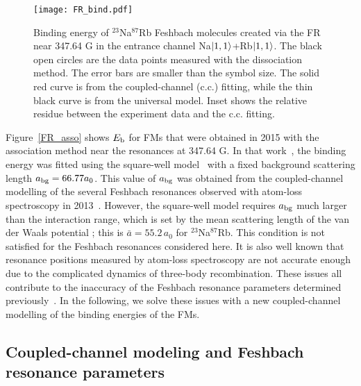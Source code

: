 \begin{figure}[htbp]
\begin{center}
\texttt{[image: FR\_bind.pdf]}
\end{center}
\caption[Binding energy of $^{23}$Na$^{87}$Rb Feshbach molecules at 347.64 G]{Binding energy of $^{23}$Na$^{87}$Rb Feshbach molecules created via the FR near 347.64 G in the entrance channel Na$\ket{1,1}$+Rb$\ket{1,1}$. The black open circles are the data points measured with the dissociation method. The error bars are smaller than the symbol size. The solid red curve is from the coupled-channel (c.c.) fitting, while the thin black curve is from the universal model. Inset shows the relative residue between the experiment data and the c.c. fitting.}
\label{FR_bind}
\end{figure}

Figure~\ref{FR_asso} shows $E_{\rm b}$ for FMs that were obtained in 2015 with the association method\cite{wang2015formation} near the resonances at 347.64 G. In that work~\cite{wang2015formation}, the binding energy was fitted using the square-well model~\cite{Lange2009} with a fixed background scattering length $a_{\rm bg} = 66.77a_0$. This value of $a_{\rm bg}$ was obtained from the coupled-channel modelling of the several Feshbach resonances observed with atom-loss spectroscopy in 2013~\cite{wang2013observation}. However, the square-well model requires $a_{\rm bg}$ much larger than the interaction range, which is set by the mean scattering length of the van der Waals potential \cite{Gribakin1993}; this is $\bar{a} = 55.2\,a_0$ for $^{23}$Na$^{87}$Rb. This condition is not satisfied for the Feshbach resonances considered here. It is also well known that resonance positions measured by atom-loss spectroscopy are not accurate enough due to the complicated dynamics of three-body recombination. These issues all contribute to the inaccuracy of the Feshbach resonance parameters determined previously~\cite{wang2015formation}. In the following, we solve these issues with a new coupled-channel modelling of the binding energies of the FMs.

\subsection{Coupled-channel modeling and Feshbach resonance parameters}
\label{sec:cc}

